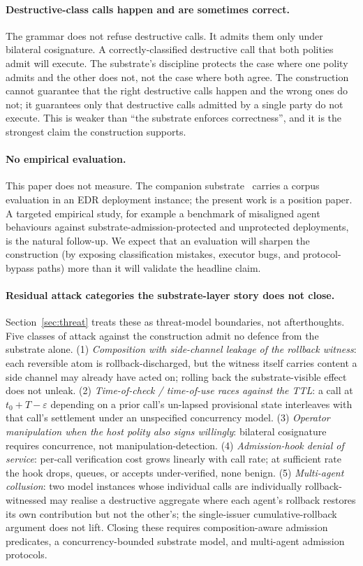 \paragraph{Destructive-class calls happen and are sometimes correct.}
The grammar does not refuse destructive calls. It admits them only under bilateral cosignature. A correctly-classified destructive call that both polities admit will execute. The substrate's discipline protects the case where one polity admits and the other does not, not the case where both agree. The construction cannot guarantee that the right destructive calls happen and the wrong ones do not; it guarantees only that destructive calls admitted by a single party do not execute. This is weaker than ``the substrate enforces correctness'', and it is the strongest claim the construction supports.

\paragraph{No empirical evaluation.}
This paper does not measure. The companion substrate~\cite{programmableSovereignty2026} carries a corpus evaluation in an EDR deployment instance; the present work is a position paper. A targeted empirical study, for example a benchmark of misaligned agent behaviours against substrate-admission-protected and unprotected deployments, is the natural follow-up. We expect that an evaluation will sharpen the construction (by exposing classification mistakes, executor bugs, and protocol-bypass paths) more than it will validate the headline claim.

\paragraph{Residual attack categories the substrate-layer story does not close.}
Section~\ref{sec:threat} treats these as threat-model boundaries, not afterthoughts. Five classes of attack against the construction admit no defence from the substrate alone. (1) \emph{Composition with side-channel leakage of the rollback witness}: each reversible atom is rollback-discharged, but the witness itself carries content a side channel may already have acted on; rolling back the substrate-visible effect does not unleak. (2) \emph{Time-of-check / time-of-use races against the TTL}: a call at $t_0 + T - \varepsilon$ depending on a prior call's un-lapsed provisional state interleaves with that call's settlement under an unspecified concurrency model. (3) \emph{Operator manipulation when the host polity also signs willingly}: bilateral cosignature requires concurrence, not manipulation-detection. (4) \emph{Admission-hook denial of service}: per-call verification cost grows linearly with call rate; at sufficient rate the hook drops, queues, or accepts under-verified, none benign. (5) \emph{Multi-agent collusion}: two model instances whose individual calls are individually rollback-witnessed may realise a destructive aggregate where each agent's rollback restores its own contribution but not the other's; the single-issuer cumulative-rollback argument does not lift. Closing these requires composition-aware admission predicates, a concurrency-bounded substrate model, and multi-agent admission protocols.


